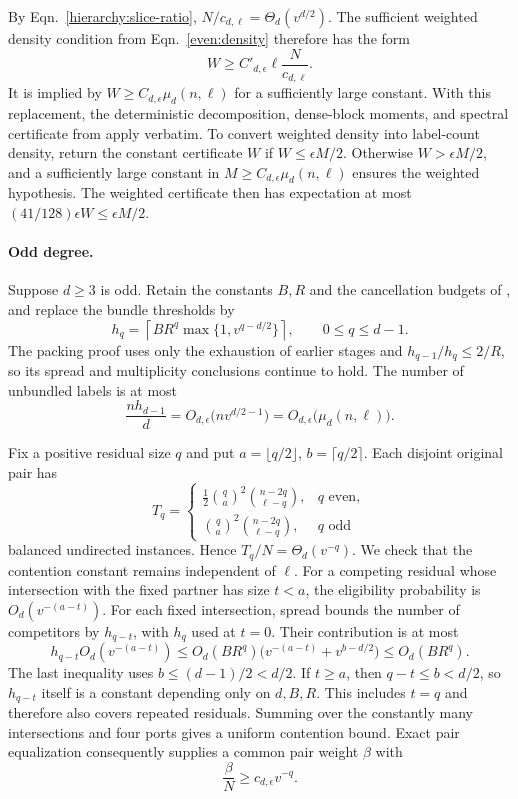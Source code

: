 \documentclass[letterpaper,11pt]{article}
\theoremstyle{definition}
\begin{document}
By Eqn.~\eqref{hierarchy:slice-ratio},
$N/c_{d,\ell}=\Theta_d(v^{d/2})$. The sufficient weighted density
condition from Eqn.~\eqref{even:density} therefore has the form
\[
 W\geq C'_{d,\epsilon}\ell\frac{N}{c_{d,\ell}}.
\]
It is implied by $W\geq C_{d,\epsilon}\mu_d(n,\ell)$ for a sufficiently
large constant. With this replacement,
the deterministic decomposition, dense-block moments, and spectral
certificate from  apply verbatim.
To convert weighted density into label-count density, return the
constant certificate $W$ if $W\leq\epsilon M/2$.
Otherwise $W>\epsilon M/2$, and a sufficiently large constant in
$M\geq C_{d,\epsilon}\mu_d(n,\ell)$ ensures the weighted hypothesis.
The weighted certificate then has expectation at most
$(41/128)\epsilon W\leq\epsilon M/2$.

\paragraph{Odd degree.}
Suppose $d\geq3$ is odd. Retain the constants $B,R$ and the
cancellation budgets of , and replace the bundle
thresholds by
\begin{equation}\label{hierarchy:bundles}
 h_q=\left\lceil BR^q
          \max\{1,v^{q-d/2}\}\right\rceil,
 \qquad 0\leq q\leq d-1.
\end{equation}
The packing proof uses only the exhaustion of earlier stages and
$h_{q-1}/h_q\leq2/R$, so its spread and multiplicity conclusions
continue to hold. The number of unbundled labels is at most
\begin{equation}\label{hierarchy:unbundled}
 \frac{nh_{d-1}}d
 =O_{d,\epsilon}\bigl(nv^{d/2-1}\bigr)
 =O_{d,\epsilon}\bigl(\mu_d(n,\ell)\bigr).
\end{equation}

Fix a positive residual size $q$ and put
$a=\lfloor q/2\rfloor$, $b=\lceil q/2\rceil$.
Each disjoint original pair has
\[
 T_q=\begin{cases}
 \frac12\binom qa^2\binom{n-2q}{\ell-q},&q\text{ even},\\
 \binom qa^2\binom{n-2q}{\ell-q},&q\text{ odd}
 \end{cases}
\]
balanced undirected instances. Hence $T_q/N=\Theta_d(v^{-q})$.
We check that the contention constant remains independent of $\ell$.
For a competing residual whose intersection with the fixed partner has
size $t<a$, the eligibility probability is $O_d(v^{-(a-t)})$.
For each fixed intersection, spread bounds the number of competitors by
$h_{q-t}$, with $h_q$ used at $t=0$. Their contribution is at most
\[
 h_{q-t}O_d(v^{-(a-t)})
 \leq O_d(BR^q)
       \bigl(v^{-(a-t)}+v^{b-d/2}\bigr)
 \leq O_d(BR^q).
\]
The last inequality uses $b\leq(d-1)/2<d/2$.
If $t\geq a$, then $q-t\leq b<d/2$, so $h_{q-t}$ itself is a
constant depending only on $d,B,R$. This includes $t=q$ and therefore
also covers repeated residuals. Summing over the constantly many
intersections and four ports gives a uniform contention bound.
Exact pair equalization consequently supplies a common pair weight
$\beta$ with
\begin{equation}\label{hierarchy:pair-weight}
 \frac\beta N\geq c_{d,\epsilon}v^{-q}.
\end{equation}
\end{document}
